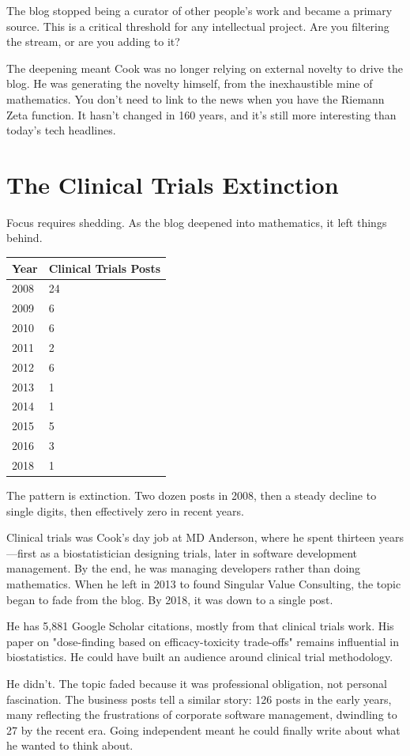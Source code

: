 The blog stopped being a curator of other people's work and became a primary source. This is a critical threshold for any intellectual project. Are you filtering the stream, or are you adding to it?

The deepening meant Cook was no longer relying on external novelty to drive the blog. He was generating the novelty himself, from the inexhaustible mine of mathematics. You don't need to link to the news when you have the Riemann Zeta function. It hasn't changed in 160 years, and it's still more interesting than today's tech headlines.

\bigskip

\section*{The Clinical Trials Extinction}

Focus requires shedding. As the blog deepened into mathematics, it left things behind.

\begin{longtable}{l p{6.5cm}}
\toprule
\textbf{Year} & \textbf{Clinical Trials Posts} \tabularnewline
\midrule
2008 & 24 \tabularnewline
2009 & 6 \tabularnewline
2010 & 6 \tabularnewline
2011 & 2 \tabularnewline
2012 & 6 \tabularnewline
2013 & 1 \tabularnewline
2014 & 1 \tabularnewline
2015 & 5 \tabularnewline
2016 & 3 \tabularnewline
2018 & 1 \tabularnewline
\bottomrule
\end{longtable}

The pattern is extinction. Two dozen posts in 2008, then a steady decline to single digits, then effectively zero in recent years.

Clinical trials was Cook's day job at MD Anderson, where he spent thirteen years---first as a biostatistician designing trials, later in software development management. By the end, he was managing developers rather than doing mathematics. When he left in 2013 to found Singular Value Consulting, the topic began to fade from the blog. By 2018, it was down to a single post.

He has 5,881 Google Scholar citations, mostly from that clinical trials work. His paper on "dose-finding based on efficacy-toxicity trade-offs" remains influential in biostatistics. He could have built an audience around clinical trial methodology.

He didn't. The topic faded because it was professional obligation, not personal fascination. The business posts tell a similar story: 126 posts in the early years, many reflecting the frustrations of corporate software management, dwindling to 27 by the recent era. Going independent meant he could finally write about what he wanted to think about.

